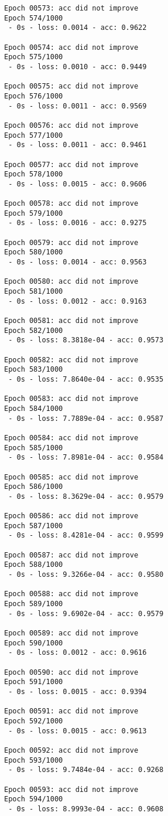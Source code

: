 \documentclass[11pt]{article}
\begin{document}
\begin{Verbatim}[commandchars=\\\{\}]
Epoch 00573: acc did not improve
Epoch 574/1000
 - 0s - loss: 0.0014 - acc: 0.9622

Epoch 00574: acc did not improve
Epoch 575/1000
 - 0s - loss: 0.0010 - acc: 0.9449

Epoch 00575: acc did not improve
Epoch 576/1000
 - 0s - loss: 0.0011 - acc: 0.9569

Epoch 00576: acc did not improve
Epoch 577/1000
 - 0s - loss: 0.0011 - acc: 0.9461

Epoch 00577: acc did not improve
Epoch 578/1000
 - 0s - loss: 0.0015 - acc: 0.9606

Epoch 00578: acc did not improve
Epoch 579/1000
 - 0s - loss: 0.0016 - acc: 0.9275

Epoch 00579: acc did not improve
Epoch 580/1000
 - 0s - loss: 0.0014 - acc: 0.9563

Epoch 00580: acc did not improve
Epoch 581/1000
 - 0s - loss: 0.0012 - acc: 0.9163

Epoch 00581: acc did not improve
Epoch 582/1000
 - 0s - loss: 8.3818e-04 - acc: 0.9573

Epoch 00582: acc did not improve
Epoch 583/1000
 - 0s - loss: 7.8640e-04 - acc: 0.9535

Epoch 00583: acc did not improve
Epoch 584/1000
 - 0s - loss: 7.7889e-04 - acc: 0.9587

Epoch 00584: acc did not improve
Epoch 585/1000
 - 0s - loss: 7.8981e-04 - acc: 0.9584

Epoch 00585: acc did not improve
Epoch 586/1000
 - 0s - loss: 8.3629e-04 - acc: 0.9579

Epoch 00586: acc did not improve
Epoch 587/1000
 - 0s - loss: 8.4281e-04 - acc: 0.9599

Epoch 00587: acc did not improve
Epoch 588/1000
 - 0s - loss: 9.3266e-04 - acc: 0.9580

Epoch 00588: acc did not improve
Epoch 589/1000
 - 0s - loss: 9.6902e-04 - acc: 0.9579

Epoch 00589: acc did not improve
Epoch 590/1000
 - 0s - loss: 0.0012 - acc: 0.9616

Epoch 00590: acc did not improve
Epoch 591/1000
 - 0s - loss: 0.0015 - acc: 0.9394

Epoch 00591: acc did not improve
Epoch 592/1000
 - 0s - loss: 0.0015 - acc: 0.9613

Epoch 00592: acc did not improve
Epoch 593/1000
 - 0s - loss: 9.7484e-04 - acc: 0.9268

Epoch 00593: acc did not improve
Epoch 594/1000
 - 0s - loss: 8.9993e-04 - acc: 0.9608


\end{Verbatim}
\end{document}
